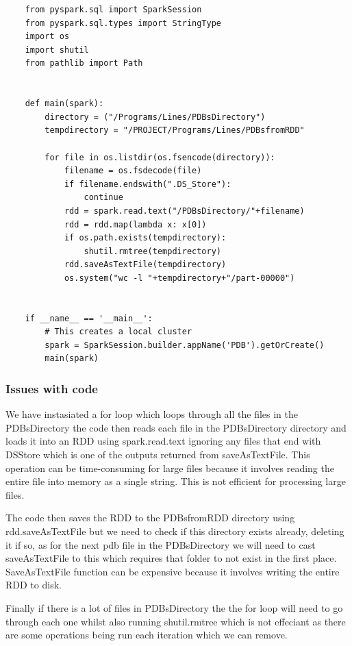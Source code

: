 \documentclass[]{final_report}
\begin{document}
\begin{lstlisting}
    from pyspark.sql import SparkSession
    from pyspark.sql.types import StringType
    import os
    import shutil
    from pathlib import Path


    def main(spark):
        directory = ("/Programs/Lines/PDBsDirectory")
        tempdirectory = "/PROJECT/Programs/Lines/PDBsfromRDD"

        for file in os.listdir(os.fsencode(directory)):
            filename = os.fsdecode(file)
            if filename.endswith(".DS_Store"):
                continue
            rdd = spark.read.text("/PDBsDirectory/"+filename)
            rdd = rdd.map(lambda x: x[0])
            if os.path.exists(tempdirectory):
                shutil.rmtree(tempdirectory)
            rdd.saveAsTextFile(tempdirectory)
            os.system("wc -l "+tempdirectory+"/part-00000")


    if __name__ == '__main__':
        # This creates a local cluster
        spark = SparkSession.builder.appName('PDB').getOrCreate()
        main(spark)
\end{lstlisting}

\clearpage

\subsubsection{Issues with code}
We have instasiated a for loop which loops through all the files in the PDBsDirectory the code then reads each file in the PDBsDirectory directory and loads it into an RDD using spark.read.text ignoring any files that end with DSStore which is one of the outputs returned from saveAsTextFile. This operation can be time-consuming for large files because it involves reading the entire file into memory as a single string. This is not efficient for processing large files.

The code then saves the RDD to the PDBsfromRDD directory using rdd.saveAsTextFile but we need to check if this directory exists already, deleting it if so, as for the next pdb file in the PDBsDirectory we will need to cast saveAsTextFile to this which requires that folder to not exist in the first place. SaveAsTextFile function can be expensive because it involves writing the entire RDD to disk.

Finally if there is a lot of files in PDBsDirectory the the for loop will need to go through each one whilst also running shutil.rmtree which is not effeciant as there are some operations being run each iteration which we can remove.
\end{document}
